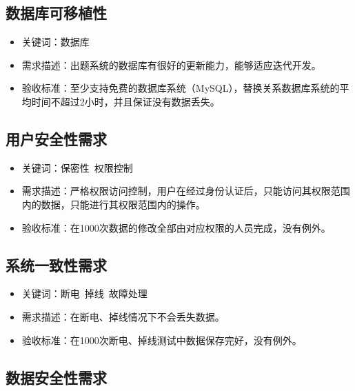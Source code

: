 \documentclass[hyperref, a4paper]{ctexart}
\providecommand{\tightlist}{%
  \setlength{\itemsep}{0pt}\setlength{\parskip}{0pt}}
\begin{document}
\hypertarget{ux6570ux636eux5e93ux53efux79fbux690dux6027}{%
\subsection{数据库可移植性}\label{ux6570ux636eux5e93ux53efux79fbux690dux6027}}

\begin{itemize}
\tightlist
\item
  关键词：数据库
\item
  需求描述：出题系统的数据库有很好的更新能力，能够适应迭代开发。
\item
  验收标准：至少支持免费的数据库系统（MySQL），替换关系数据库系统的平均时间不超过2小时，并且保证没有数据丢失。
\end{itemize}

\hypertarget{ux7528ux6237ux5b89ux5168ux6027ux9700ux6c42}{%
\subsection{用户安全性需求}\label{ux7528ux6237ux5b89ux5168ux6027ux9700ux6c42}}

\begin{itemize}
\tightlist
\item
  关键词：保密性~权限控制
\item
  需求描述：严格权限访问控制，用户在经过身份认证后，只能访问其权限范围内的数据，只能进行其权限范围内的操作。
\item
  验收标准：在1000次数据的修改全部由对应权限的人员完成，没有例外。
\end{itemize}

\hypertarget{ux7cfbux7edfux4e00ux81f4ux6027ux9700ux6c42}{%
\subsection{系统一致性需求}\label{ux7cfbux7edfux4e00ux81f4ux6027ux9700ux6c42}}

\begin{itemize}
\tightlist
\item
  关键词：断电~掉线~故障处理
\item
  需求描述：在断电、掉线情况下不会丢失数据。
\item
  验收标准：在1000次断电、掉线测试中数据保存完好，没有例外。
\end{itemize}

\hypertarget{ux6570ux636eux5b89ux5168ux6027ux9700ux6c42}{%
\subsection{数据安全性需求}\label{ux6570ux636eux5b89ux5168ux6027ux9700ux6c42}}
\end{document}
